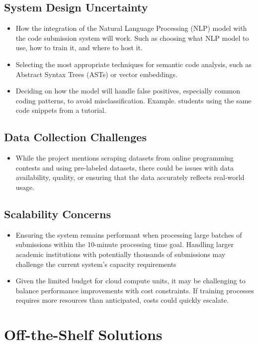\documentclass[12pt]{article}
\begin{document}
\subsection{System Design Uncertainty}
\begin{itemize}
    \item How the integration of the Natural Language Processing (NLP) model with the code submission system will work. Such as choosing what NLP model to use, how to train it, and where to host it.
    \item Selecting the most appropriate techniques for semantic code analysis, such as Abstract Syntax Trees (ASTs) or vector embeddings.
    \item Deciding on how the model will handle false positives, especially common coding patterns, to avoid misclassification. Example. students using the same code snippets from a tutorial.
\end{itemize}

\subsection {Data Collection Challenges}
\begin{itemize}
    \item While the project mentions scraping datasets from online programming contests and using pre-labeled datasets, 
    there could be issues with data availability, quality, or ensuring that the data accurately reflects real-world usage.
\end{itemize}

\subsection {Scalability Concerns}
\begin{itemize}
    \item Ensuring the system remains performant when processing large batches of submissions within the 10-minute processing time goal. 
    Handling larger academic institutions with potentially thousands of submissions may challenge the current system's capacity requirements
    \item  Given the limited budget for cloud compute units, it may be challenging to balance performance improvements with cost constraints. 
    If training processes requires more resources than anticipated, costs could quickly escalate.
\end{itemize}
\section{Off-the-Shelf Solutions}
\end{document}
